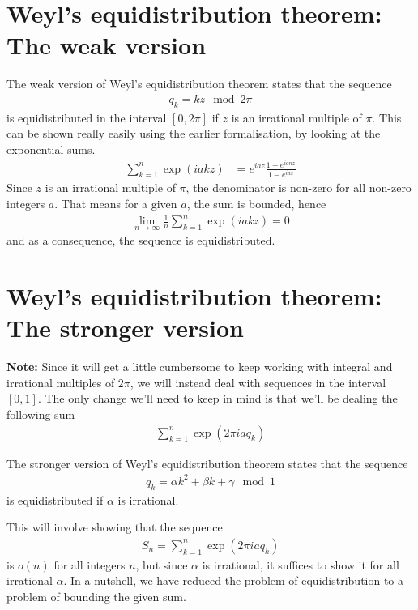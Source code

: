 \documentclass[12pt]{article}
\theoremstyle{definition}
\begin{document}
\section{Weyl's equidistribution theorem: The weak version}
The weak version of Weyl's equidistribution theorem states that the sequence
\begin{align*}
    q_k = kz \mod 2\pi
\end{align*}
is equidistributed in the interval $[0,2\pi]$ if $z$ is an irrational multiple of $\pi$. This can be shown really easily using the earlier formalisation, by looking at the exponential sums.
\begin{align*}
    \sum_{k=1}^{n} \exp(iakz) &= e^{iaz} \frac{1 - e^{ianz}}{1 - e^{iaz}}
\end{align*}
Since $z$ is an irrational multiple of $\pi$, the denominator is non-zero for all non-zero integers $a$. That means for a given $a$, the sum is bounded, hence
\begin{align*}
    \lim\limits_{n \to \infty} \frac{1}{n} \sum_{k=1}^{n} \exp(iakz) = 0
\end{align*}
and as a consequence, the sequence is equidistributed.

\section{Weyl's equidistribution theorem: The stronger version}
\textbf{Note:} Since it will get a little cumbersome to keep working with integral and irrational multiples of $2\pi$, we will instead deal with sequences in the interval $[0,1]$. The only change we'll need to keep in mind is that we'll be dealing the following sum
\begin{align*}
     \sum_{k=1}^{n} \exp(2\pi iaq_k)
\end{align*}

The stronger version of Weyl's equidistribution theorem states that the sequence
\begin{align*}
    q_k = \alpha k^2 + \beta k + \gamma \mod 1
\end{align*}
is equidistributed if $\alpha$ is irrational.
 
This will involve showing that the sequence
\begin{align}
    S_n = \sum_{k=1}^{n} \exp(2\pi i aq_k) \label{target:1}
\end{align}
is $o(n)$ for all integers $n$, but since $\alpha$ is irrational, it suffices to show it for all irrational $\alpha$. In a nutshell, we have reduced the problem of equidistribution to a problem of bounding the given sum.
 
\end{document}
